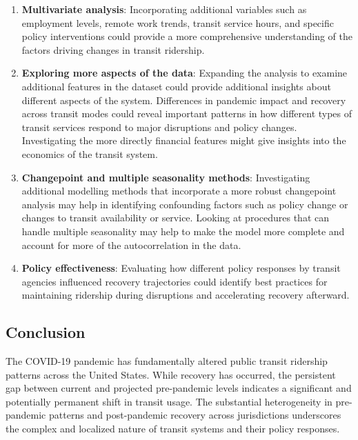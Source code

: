 \documentclass[11pt]{article}
\begin{document}
\begin{enumerate}
\item \textbf{Multivariate analysis}: Incorporating additional variables such as employment levels, remote work trends, transit service hours, and specific policy interventions could provide a more comprehensive understanding of the factors driving changes in transit ridership.

\item \textbf{Exploring more aspects of the data}: Expanding the analysis to examine additional features in the dataset could provide additional insights about different aspects of the system. Differences in pandemic impact and recovery across transit modes could reveal important patterns in how different types of transit services respond to major disruptions and policy changes. Investigating the more directly financial features might give insights into the economics of the transit system.

\item \textbf{Changepoint and multiple seasonality methods}: Investigating additional modelling methods that incorporate a more robust changepoint analysis may help in identifying confounding factors such as policy change or changes to transit availability or service. Looking at procedures that can handle multiple seasonality may help to make the model more complete and account for more of the autocorrelation in the data.

\item \textbf{Policy effectiveness}: Evaluating how different policy responses by transit agencies influenced recovery trajectories could identify best practices for maintaining ridership during disruptions and accelerating recovery afterward.
\end{enumerate}

\subsection{Conclusion}

The COVID-19 pandemic has fundamentally altered public transit ridership patterns across the United States. While recovery has occurred, the persistent gap between current and projected pre-pandemic levels indicates a significant and potentially permanent shift in transit usage. The substantial heterogeneity in pre-pandemic patterns and post-pandemic recovery across jurisdictions underscores the complex and localized nature of transit systems and their policy responses.
\end{document}
